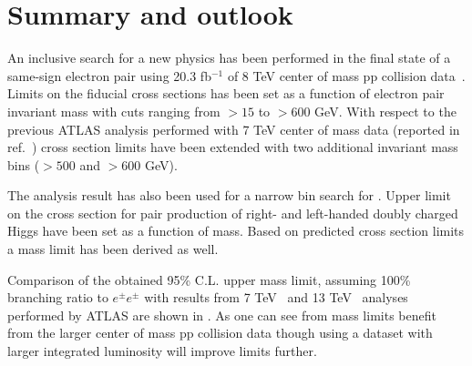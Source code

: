 \section{Summary and outlook}
\label{sec:ssOutlook}

An inclusive search for a new physics has been performed in the final state of a same-sign electron pair using 20.3 fb$^{-1}$ of 8 TeV center of mass pp collision data~\cite{ss_8TeV}. Limits on the fiducial cross sections has been set as a function of electron pair invariant mass with cuts ranging from $>15$ to $>600$ GeV.
With respect to the previous ATLAS analysis performed with 7 TeV center of mass data (reported in ref.~\cite{ss_7TeV}) cross section limits have been 
extended with two additional invariant mass bins ($>500$ and $>600$ GeV).

The analysis result has also been used for a narrow bin search for \dch.
Upper limit on the cross section for pair production of right- and left-handed doubly charged Higgs have been set as a function of \dch mass.
Based on predicted cross section limits a mass limit has been derived as well.

Comparison of the obtained 95\% C.L. upper \dch mass limit, assuming 100\% branching ratio to $e^{\pm}e^{\pm}$ with results from 7 TeV~\cite{dch_7TeV_paper} and 13 TeV~\cite{dch_13TeV_conf} analyses performed by ATLAS are shown in .
As one can see from  mass limits benefit from the larger center of mass pp collision data though using a dataset with larger integrated luminosity will improve limits further.

